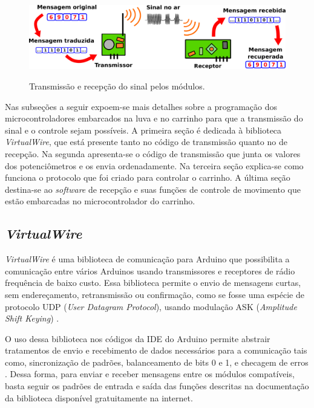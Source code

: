 \documentclass[
	12pt,				%
	openright,			%
	oneside,			%
	a4paper,			%
	english,			%
	brazil				%
	]{abntex2}
\begin{document}
		\begin{figure}[h!]
			\centering
			\caption{Transmissão e recepção do sinal pelos módulos.}
  		\includegraphics[width=14cm]{./figures/tx-rx-scheme1.png}
  		\label{Fig:tx-rx-scheme1}
		\end{figure}

		Nas subseções a seguir expoem-se mais detalhes sobre a programação dos microcontroladores embarcados na luva e no carrinho para que a transmissão do sinal e o controle sejam possíveis. A primeira seção é dedicada à biblioteca \textit{VirtualWire}, que está presente tanto no código de transmissão quanto no de recepção. Na segunda apresenta-se o código de transmissão que junta os valores dos potenciômetros e os envia ordenadamente. Na terceira seção explica-se como funciona o protocolo que foi criado para controlar o carrinho. A última seção destina-se ao \textit{software} de recepção e suas funções de controle de movimento que estão embarcadas no microcontrolador do carrinho.


		\subsection{\textit{VirtualWire}}


		\textit{VirtualWire} é uma biblioteca de comunicação para Arduino que possibilita a comunicação entre vários Arduinos usando transmissores e receptores de rádio frequência de baixo custo. Essa biblioteca permite o envio de mensagens curtas, sem endereçamento, retransmissão ou confirmação, como se fosse uma espécie de protocolo UDP (\textit{User Datagram Protocol}), usando modulação ASK (\textit{Amplitude Shift Keying}) \cite{virtualwiremanual}. 

		O uso dessa biblioteca nos códigos da IDE do Arduino permite abstrair tratamentos de envio e recebimento de dados necessários para a comunicação tais como, sincronização de padrões, balanceamento de bits 0 e 1, e checagem de erros \cite{virtualwirepjrc}. Dessa forma, para enviar e receber mensagens entre os módulos compatíveis, basta seguir os padrões de entrada e saída das funções descritas na documentação da biblioteca disponível gratuitamente na internet.
\end{document}
